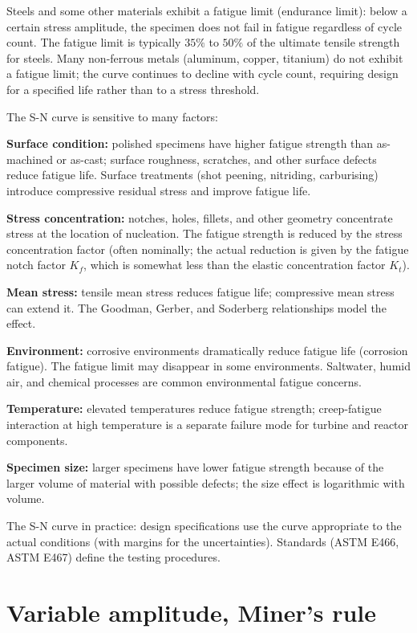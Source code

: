 Steels and some other materials exhibit a fatigue limit (endurance limit): below a certain stress amplitude, the specimen does not fail in fatigue regardless of cycle count. The fatigue limit is typically $35\%$ to $50\%$ of the ultimate tensile strength for steels. Many non-ferrous metals (aluminum, copper, titanium) do not exhibit a fatigue limit; the curve continues to decline with cycle count, requiring design for a specified life rather than to a stress threshold.

The S-N curve is sensitive to many factors:

\textbf{Surface condition:} polished specimens have higher fatigue strength than as-machined or as-cast; surface roughness, scratches, and other surface defects reduce fatigue life. Surface treatments (shot peening, nitriding, carburising) introduce compressive residual stress and improve fatigue life.

\textbf{Stress concentration:} notches, holes, fillets, and other geometry concentrate stress at the location of nucleation. The fatigue strength is reduced by the stress concentration factor (often nominally; the actual reduction is given by the fatigue notch factor $K_f$, which is somewhat less than the elastic concentration factor $K_t$).

\textbf{Mean stress:} tensile mean stress reduces fatigue life; compressive mean stress can extend it. The Goodman, Gerber, and Soderberg relationships model the effect.

\textbf{Environment:} corrosive environments dramatically reduce fatigue life (corrosion fatigue). The fatigue limit may disappear in some environments. Saltwater, humid air, and chemical processes are common environmental fatigue concerns.

\textbf{Temperature:} elevated temperatures reduce fatigue strength; creep-fatigue interaction at high temperature is a separate failure mode for turbine and reactor components.

\textbf{Specimen size:} larger specimens have lower fatigue strength because of the larger volume of material with possible defects; the size effect is logarithmic with volume.

The S-N curve in practice: design specifications use the curve appropriate to the actual conditions (with margins for the uncertainties). Standards (ASTM E466, ASTM E467) define the testing procedures.

\section{Variable amplitude, Miner's rule}

